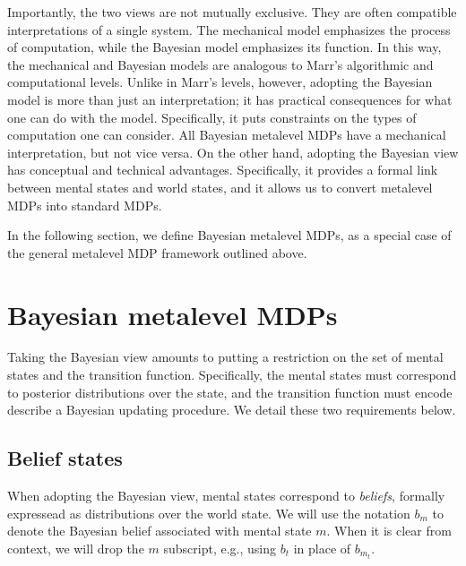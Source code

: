 Importantly, the two views are not mutually exclusive. They are often compatible interpretations of a single system. The mechanical model emphasizes the process of computation, while the Bayesian model emphasizes its function. In this way, the mechanical and Bayesian models are analogous to Marr's algorithmic and computational levels. Unlike in Marr's levels, however, adopting the Bayesian model is more than just an interpretation; it has practical consequences for what one can do with the model. Specifically, it puts constraints on the types of computation one can consider. All Bayesian metalevel MDPs have a mechanical interpretation, but not vice versa. On the other hand, adopting the Bayesian view has conceptual and technical advantages. Specifically, it provides a formal link between mental states and world states, and it allows us to convert metalevel MDPs into standard MDPs.

In the following section, we define Bayesian metalevel MDPs, as a special case of the general metalevel MDP framework outlined above.

\section{Bayesian metalevel MDPs}

Taking the Bayesian view amounts to putting a restriction on the set of mental states and the transition function. Specifically, the mental states must correspond to posterior distributions over the state, and the transition function must encode describe a Bayesian updating procedure. We detail these two requirements below.


\subsection{Belief states}

When adopting the Bayesian view, mental states correspond to \emph{beliefs}, formally expressead as distributions over the world state. We will use the notation $b_m$ to denote the Bayesian belief associated with mental state $m$. When it is clear from context, we will drop the $m$ subscript, e.g., using $b_t$ in place of $b_{m_t}$. 

